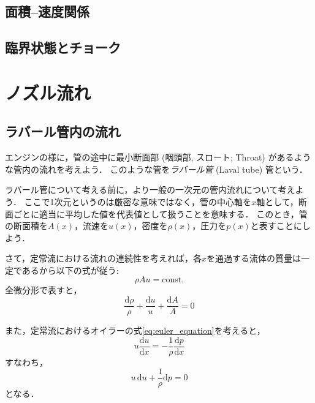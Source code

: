 \documentclass[uplatex,dvipdfmx,a4j,11pt]{jsreport}
\newcommand{\diff}{\mathrm{d}} %
\numberwithin{equation}{chapter}
\begin{document}
\subsection{面積--速度関係}

\subsection{臨界状態とチョーク}

\section{ノズル流れ}

\subsection{ラバール管内の流れ}

エンジンの様に，管の途中に最小断面部 (咽頭部, スロート; Throat) があるような管内の流れを考えよう．
このような管を\emph{ラバール管} (Laval tube) 管という．

\enskip

ラバール管について考える前に，より一般の一次元の管内流れについて考えよう．
ここで1次元というのは厳密な意味ではなく，管の中心軸を$x$軸として，断面ごとに適当に平均した値を代表値として扱うことを意味する．
このとき，管の断面積を$A(x)$，流速を$u(x)$，密度を$\rho(x)$，圧力を$p(x)$と表すことにしよう．

さて，定常流における流れの連続性を考えれば，各$x$を通過する流体の質量は一定であるから以下の式が従う:
\begin{equation}
  \rho A u = \text{const.}
  \label{eq:continuity_1d}
\end{equation}
全微分形で表すと，
\begin{equation}
  \frac{\diff \rho}{\rho} + \frac{\diff u}{u} + \frac{\diff A}{A} = 0
  \label{eq:continuity_1d_diff}
\end{equation}

また，定常流におけるオイラーの式\ref{eq:euler_equation}を考えると，
\begin{equation*}
  u\frac{\diff u}{\diff x} = - \frac{1}{\rho} \frac{\diff p}{\diff x}
\end{equation*}
すなわち，
\begin{equation}
  u \, \diff u + \frac{1}{\rho} \diff p = 0
  \label{eq:euler_1d}
\end{equation}
となる．
\end{document}
